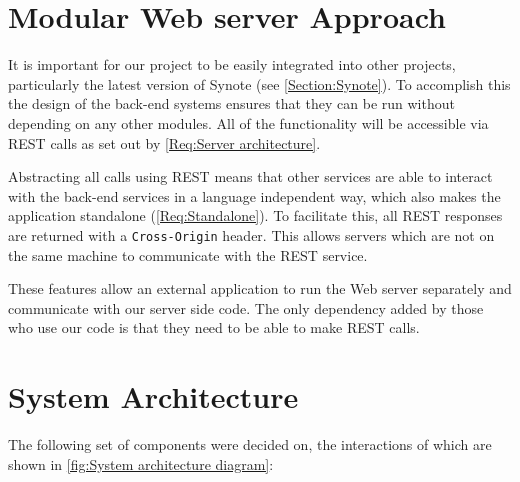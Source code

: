 \section{Modular Web server Approach}
\label{Section:Modular Approach}

It is important for our project to be easily integrated into other projects, particularly the latest version of Synote (see \autoref{Section:Synote}). To accomplish this the design of the back-end systems ensures that they can be run without depending on any other modules. All of the functionality will be accessible via \gls{REST} calls as set out by \cref{Req:Server architecture}.

Abstracting all calls using \gls{REST} means that other services are able to interact with the back-end services in a language independent way, which also makes the application standalone (\cref{Req:Standalone}). To facilitate this, all \gls{REST} responses are returned with a \texttt{Cross-Origin} header. This allows servers which are not on the same machine to communicate with the \gls{REST} service.

These features allow an external application to run the Web server separately and communicate with our server side code. The only dependency added by those who use our code is that they need to be able to make \gls{REST} calls.

\section{System Architecture}

The following set of components were decided on, the interactions of which are shown in \autoref{fig:System architecture diagram}:


